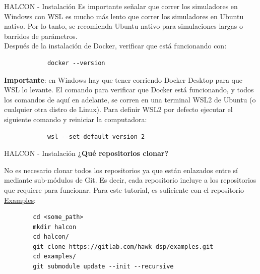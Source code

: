 \documentclass[11pt]{beamer}
\begin{document}
	\begin{frame}[fragile]{HALCON - Instalación}
		Es importante señalar que correr los simuladores en Windows con WSL es mucho más lento que correr los simuladores en Ubuntu nativo. Por lo tanto, se recomienda Ubuntu nativo para simulaciones largas o barridos de parámetros.\\
		Después de la instalación de Docker, verificar que está funcionando con:
		
		\begin{lstlisting}
			docker --version
		\end{lstlisting}
		
		\textbf{Importante}: en Windows hay que tener corriendo Docker Desktop para que WSL lo levante. El comando para verificar que Docker está funcionando, y todos los comandos de aquí en adelante, se corren en una terminal WSL2 de Ubuntu (o cualquier otra distro de Linux). Para definir WSL2 por defecto ejecutar el siguiente comando y reiniciar la computadora:
		
		\begin{lstlisting}
			wsl --set-default-version 2
		\end{lstlisting}
		
	\end{frame}
	
	
	\begin{frame}[fragile]{HALCON - Instalación}
	\textbf{¿Qué repositorios clonar?}\newline
	
	No es necesario clonar todos los repositorios ya que están enlazados entre sí mediante sub-módulos de Git. Es decir, cada repositorio incluye a los repositorios que requiere para funcionar.\newline
	Para este tutorial, es suficiente con el repositorio \underline{Examples}:\newline
	
	\begin{lstlisting}
		cd <some_path>
		mkdir halcon
		cd halcon/
		git clone https://gitlab.com/hawk-dsp/examples.git
		cd examples/
		git submodule update --init --recursive
	\end{lstlisting}
	
	\end{frame}
	
\end{document}
